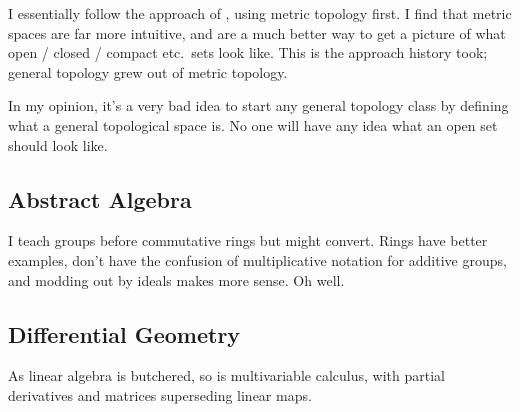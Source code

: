 I essentially follow the approach of \cite{ref:pugh}, using metric topology first.
I find that metric spaces are far more intuitive, and are a much better
way to get a picture of what open / closed / compact etc.\ sets look like.
This is the approach history took;
general topology grew out of metric topology.

In my opinion, it's a very bad idea to start any general topology class
by defining what a general topological space is.
No one will have any idea what an open set should look like.


\subsection{Abstract Algebra}
I teach groups before commutative rings but might convert.
Rings have better examples, don't have the confusion of multiplicative
notation for additive groups, and modding out by ideals makes more sense.
Oh well.

\subsection{Differential Geometry}
As linear algebra is butchered, so is multivariable calculus,
with partial derivatives and matrices superseding linear maps.

